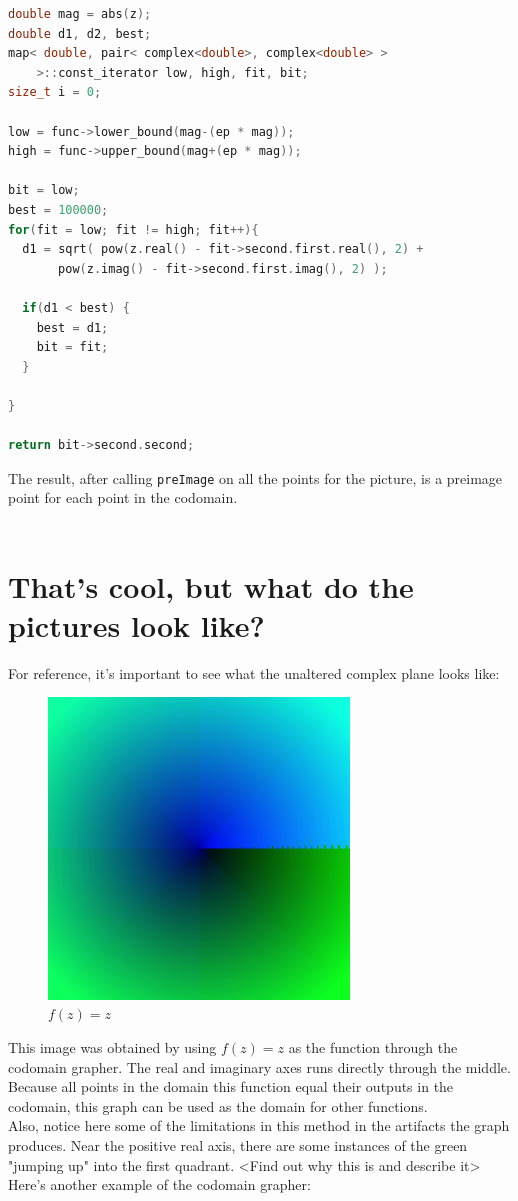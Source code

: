 \documentclass[letterpaper,12pt]{article}
\begin{document}
\begin{lstlisting}[language=c++]
double mag = abs(z);
double d1, d2, best;
map< double, pair< complex<double>, complex<double> >
    >::const_iterator low, high, fit, bit;
size_t i = 0;

low = func->lower_bound(mag-(ep * mag));
high = func->upper_bound(mag+(ep * mag));

bit = low;
best = 100000;
for(fit = low; fit != high; fit++){
  d1 = sqrt( pow(z.real() - fit->second.first.real(), 2) +
       pow(z.imag() - fit->second.first.imag(), 2) );

  if(d1 < best) {
    best = d1;
    bit = fit;
  }

}

return bit->second.second;

\end{lstlisting}

The result, after calling \verb|preImage| on all the points for the picture, is a preimage point for each point in the codomain. \\ \\

\section{That's cool, but what do the pictures look like?}

For reference, it's important to see what the unaltered complex plane looks like:

\begin{figure}[h]
	\includegraphics[width=8cm]{f(z)=z}
	\centering
	\caption{\small$f(z) = z$}
	\centering
\end{figure}

This image was obtained by using $f(z) = z$ as the function through the codomain grapher.
The real and imaginary axes runs directly through the middle.
Because all points in the domain this function equal their outputs in the codomain, this graph can be used as the domain for other functions.
\\
Also, notice here some of the limitations in this method in the artifacts the graph produces.
Near the positive real axis, there are some instances of the green "jumping up" into the first quadrant.
<Find out why this is and describe it>
\\
Here's another example of the codomain grapher:
\end{document}
